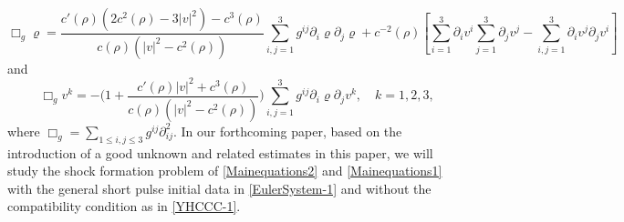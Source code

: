 \documentclass[11pt,twoside]{article}
\def\p{\partial}
\begin{document}
\begin{remark}
\begin{equation}\label{Mainequations2}
\Box_{g}\varrho=\frac{c'(\rho)(2c^2(\rho)-3|v|^2)-c^3(\rho)}{c(\rho)(|v|^2-c^2(\rho))}\sum_{i,j=1}^3g^{ij}\partial_i\varrho \p_j \varrho+c^{-2}(\rho)[\sum_{i=1}^3\p_i v^i\sum_{j=1}^3\p_j v^j-\sum_{i,j=1}^3\p_i v^j\p_j v^i]
\end{equation}
and
\begin{equation}\label{Mainequations1}
	\Box_{g}{v^{k}}=-\bigg(1+\frac{c'(\rho)|v|^2+c^3(\rho)}{c(\rho)(|v|^2-c^2(\rho))}\bigg)
\sum_{i,j=1}^3g^{ij}\p_i\varrho \p_j v^k,\quad k=1,2,3,
\end{equation}
where $\Box_{g}=\sum_{1\le i,j\le 3}g^{ij}\partial_{ij}^2$.
In our forthcoming paper, based on the introduction of a good unknown and related estimates in this paper,
we will study the shock formation problem of \eqref{Mainequations2} and \eqref{Mainequations1} with the general short pulse initial data
in \eqref{EulerSystem-1} and without the compatibility condition as in \eqref{YHCCC-1}.
\end{remark}
\end{document}
